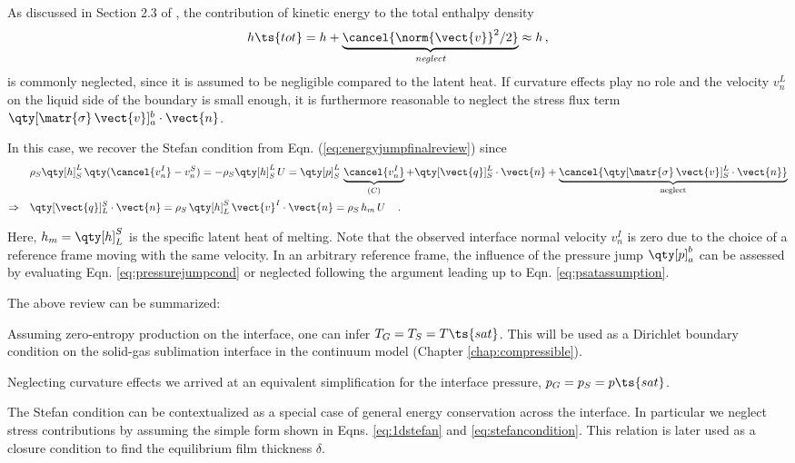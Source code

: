 As discussed in Section 2.3 of \cite{myers2020stefan}, the contribution of kinetic energy  to the total enthalpy density 
\begin{equation}
     h\ts{tot}= h+ \underbrace{\cancel{\norm{\vect{v}}^2/2}}_{\textit{neglect}} \approx h \, ,\notag
\end{equation}
is commonly neglected, since it is assumed to be negligible compared to the latent heat. If curvature effects play no role and the velocity $v^L_n$ on the liquid side of the boundary is small enough, it is furthermore reasonable to neglect the stress flux term $\qty[\matr{\sigma}\,\vect{v}]_a^b \cdot \vect{n}$. 

In this case, we recover the Stefan condition from Eqn. (\ref{eq:energyjumpfinalreview}) since
\begin{align}
    & 
    \rho_S\qty[h]_S^L\,\qty(\cancel{v^I_n}-v^S_n) = -\rho_S\qty[h]_S^L\,U 
    =\qty[p]_S^L\,\underbrace{\cancel{v^I_n}}_{(C)} 
    + \qty[\vect{q}]_S^L\cdot\vect{n}
    + \underbrace{\cancel{\qty[\matr{\sigma}\,\vect{v}]_S^L \cdot \vect{n}}}_{\text{neglect}} \notag\\
    \Rightarrow \quad &
    \qty[\vect{q}]_{L}^{S}\cdot \vect{n} 
    = \rho_S\,\qty[ h ]_{L}^{S}\, \vect{v}^I\cdot \vect{n} = \rho_S \, h_m \,U\, \quad . \label{eq:stefancondition}
\end{align}

 Here, $h_m =\qty[ h ]_{L}^{S} $ is the specific latent heat of melting. Note that the observed interface normal velocity $v^I_n$ is zero due to the choice of a reference frame moving with the same velocity. In an arbitrary reference frame, the influence of the pressure jump $ \qty[p]_a^b$ can be assessed by evaluating Eqn. \ref{eq:pressurejumpcond} or neglected following the argument leading up to Eqn. \ref{eq:psatassumption}. 
 
 The above review can be summarized:
 \begin{itemize}
     \begin{framed}
     \item Assuming zero-entropy production on the interface, one can infer $T_G = T_S = T\ts{sat}$. This will be used as a Dirichlet boundary condition on the solid-gas sublimation interface in the continuum model (Chapter \ref{chap:compressible}). 
     \item Neglecting curvature effects we arrived at an equivalent simplification for the interface pressure, $p_G= p_S = p\ts{sat}$.
     \item The Stefan condition can be contextualized as a special case of general energy conservation across the interface. In particular we neglect stress contributions by assuming the simple form shown in Eqns. \ref{eq:1dstefan} and \ref{eq:stefancondition}. This relation is later used as a closure condition to find the equilibrium film thickness $\delta$.
     \end{framed}
 \end{itemize}
 
 
 




